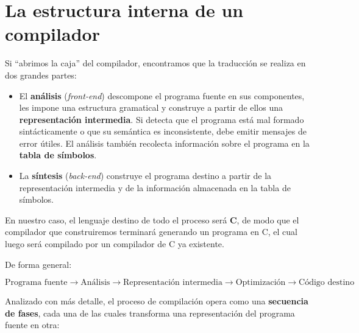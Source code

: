 \documentclass[11pt,a4paper]{article}
\begin{document}
\section{La estructura interna de un compilador}

Si ``abrimos la caja'' del compilador, encontramos que la traducción se realiza en dos grandes
partes:

\begin{itemize}
    \item El \textbf{análisis} (\textit{front-end}) descompone el programa fuente en sus
    componentes, les impone una estructura gramatical y construye a partir de ellos una
    \textbf{representación intermedia}. Si detecta que el programa está mal formado
    sintácticamente o que su semántica es inconsistente, debe emitir mensajes de error útiles.
    El análisis también recolecta información sobre el programa en la \textbf{tabla de
    símbolos}.
    \item La \textbf{síntesis} (\textit{back-end}) construye el programa destino a partir de la
    representación intermedia y de la información almacenada en la tabla de símbolos.
\end{itemize}

En nuestro caso, el lenguaje destino de todo el proceso será \textbf{C}, de modo que el
compilador que construiremos terminará generando un programa en C, el cual luego será
compilado por un compilador de C ya existente.

De forma general:

\[
\text{Programa fuente} \rightarrow \text{Análisis} \rightarrow \text{Representación intermedia}
\rightarrow \text{Optimización} \rightarrow \text{Código destino}
\]

Analizado con más detalle, el proceso de compilación opera como una \textbf{secuencia de
fases}, cada una de las cuales transforma una representación del programa fuente en otra:
\end{document}
